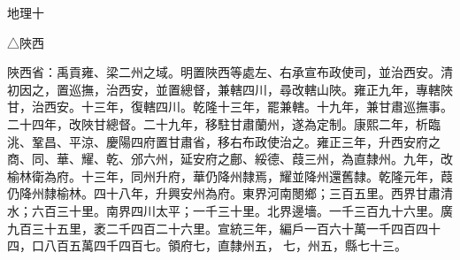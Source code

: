 
\begin{pinyinscope}
地理十

△陜西

陜西省：禹貢雍、梁二州之域。明置陜西等處左、右承宣布政使司，並治西安。清初因之，置巡撫，治西安，並置總督，兼轄四川，尋改轄山陜。雍正九年，專轄陜甘，治西安。十三年，復轄四川。乾隆十三年，罷兼轄。十九年，兼甘肅巡撫事。二十四年，改陜甘總督。二十九年，移駐甘肅蘭州，遂為定制。康熙二年，析臨洮、鞏昌、平涼、慶陽四府置甘肅省，移右布政使治之。雍正三年，升西安府之商、同、華、耀、乾、邠六州，延安府之鄜、綏德、葭三州，為直隸州。九年，改榆林衛為府。十三年，同州升府，華仍降州隸焉，耀並降州還舊隸。乾隆元年，葭仍降州隸榆林。四十八年，升興安州為府。東界河南閿鄉；三百五里。西界甘肅清水；六百三十里。南界四川太平；一千三十里。北界邊墻。一千三百九十六里。廣九百三十五里，袤二千四百二十六里。宣統三年，編戶一百六十萬一千四百四十四，口八百五萬四千四百七。領府七，直隸州五，七，州五，縣七十三。


\end{pinyinscope}
